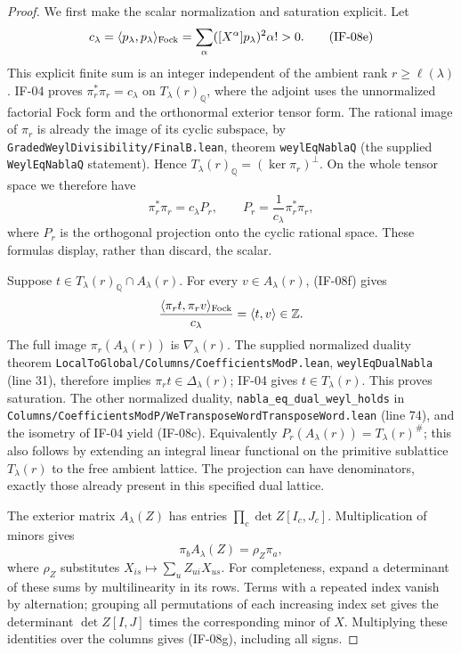 \begin{proof}
We first make the scalar normalization and saturation explicit. Let
\[
 c_\lambda=\langle p_\lambda,p_\lambda\rangle_{\rm Fock}
   =\sum_\alpha ([X^\alpha]p_\lambda)^2\alpha!>0.
                                                               \tag{IF-08e}
\]
This explicit finite sum is an integer independent of the ambient rank $r\geq\ell(\lambda)$.
IF-04 proves $\pi_r^*\pi_r=c_\lambda$ on $T_\lambda(r)_\mathbb Q$,
where the adjoint uses the unnormalized factorial Fock form and the
orthonormal exterior tensor form. The rational image of $\pi_r$ is
already the image of its cyclic subspace, by
\texttt{GradedWeylDivisibility/FinalB.lean}, theorem
\texttt{weylEqNablaQ} (the supplied \texttt{WeylEqNablaQ} statement).
Hence $T_\lambda(r)_\mathbb Q=(\ker\pi_r)^\perp$. On the whole tensor
space we therefore have
\[
 \pi_r^*\pi_r=c_\lambda P_r,\qquad
 P_r=\frac1{c_\lambda}\pi_r^*\pi_r,                 \tag{IF-08f}
\]
where $P_r$ is the orthogonal projection onto the cyclic rational
space. These formulas display, rather than discard, the scalar.

Suppose $t\in T_\lambda(r)_\mathbb Q\cap A_\lambda(r)$.
For every $v\in A_\lambda(r)$, (IF-08f) gives
\[
 \frac{\langle\pi_rt,\pi_rv\rangle_{\rm Fock}}{c_\lambda}
       =\langle t,v\rangle\in\mathbb Z.
\]
The full image $\pi_r(A_\lambda(r))$ is $\nabla_\lambda(r)$.
The supplied normalized duality theorem
\texttt{LocalToGlobal/Columns/CoefficientsModP.lean},
\texttt{weylEqDualNabla} (line 31),
therefore implies $\pi_rt\in\Delta_\lambda(r)$; IF-04 gives
$t\in T_\lambda(r)$. This proves saturation. The other normalized
duality, \texttt{nabla\_eq\_dual\_weyl\_holds} in
\texttt{Columns/CoefficientsModP/WeTransposeWordTransposeWord.lean}
(line 74), and the isometry of IF-04 yield
(IF-08c). Equivalently $P_r(A_\lambda(r))=T_\lambda(r)^\#$;
this also follows by extending an integral linear functional on the
primitive sublattice $T_\lambda(r)$ to the free ambient lattice.
The projection can have denominators, exactly those already present
in this specified dual lattice.

The exterior matrix $A_\lambda(Z)$ has entries
$\prod_c\det Z[I_c,J_c]$. Multiplication of minors gives
\[
 \pi_b A_\lambda(Z)=\rho_Z\pi_a,                  \tag{IF-08g}
\]
where $\rho_Z$ substitutes $X_{is}\mapsto\sum_u Z_{ui}X_{us}$.
For completeness, expand a determinant of these sums by multilinearity
in its rows. Terms with a repeated index vanish by alternation; grouping
all permutations of each increasing index set gives the determinant
$\det Z[I,J]$ times the corresponding minor of $X$. Multiplying these
identities over the columns gives (IF-08g), including all signs.


\end{proof}
